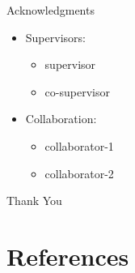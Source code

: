 \documentclass[xcolor=table]{beamer}
\begin{document}
\begin{frame}{Acknowledgments}
    \begin{itemize}
        \item Supervisors:
        \begin{itemize}
            \item supervisor
            \item co-supervisor
        \end{itemize}
        \item Collaboration:
        \begin{itemize}
            \item collaborator-1
            \item collaborator-2
        \end{itemize}
        \end{itemize}
\end{frame}
\begin{frame}
    \begin{center}
        {\Huge\calligra Thank You}
    \end{center}
\end{frame}
\section{References}
\begin{frame}[allowframebreaks]
    
    
    \nocite{*} %
\end{frame}
\end{document}
